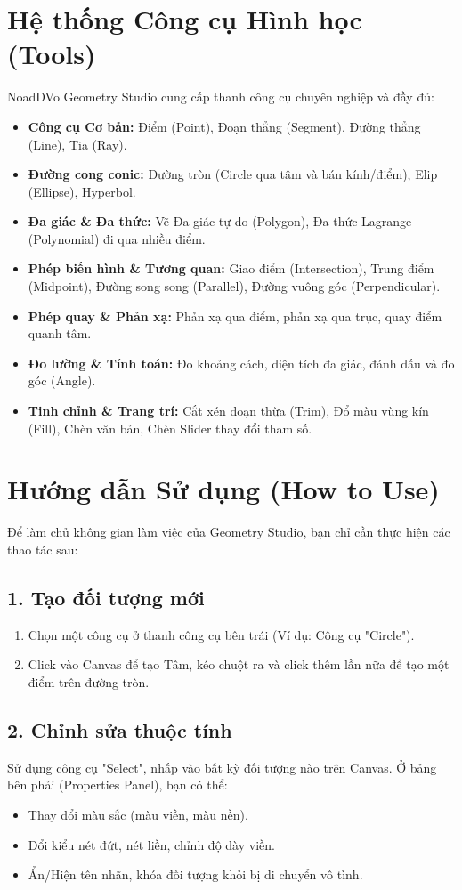 \documentclass[12pt,a4paper]{article}
\begin{document}
\section{Hệ thống Công cụ Hình học (Tools)}
NoadDVo Geometry Studio cung cấp thanh công cụ chuyên nghiệp và đầy đủ:
\begin{itemize}[label=$\circ$]
    \item \textbf{Công cụ Cơ bản:} Điểm (Point), Đoạn thẳng (Segment), Đường thẳng (Line), Tia (Ray).
    \item \textbf{Đường cong conic:} Đường tròn (Circle qua tâm và bán kính/điểm), Elip (Ellipse), Hyperbol.
    \item \textbf{Đa giác \& Đa thức:} Vẽ Đa giác tự do (Polygon), Đa thức Lagrange (Polynomial) đi qua nhiều điểm.
    \item \textbf{Phép biến hình \& Tương quan:} Giao điểm (Intersection), Trung điểm (Midpoint), Đường song song (Parallel), Đường vuông góc (Perpendicular).
    \item \textbf{Phép quay \& Phản xạ:} Phản xạ qua điểm, phản xạ qua trục, quay điểm quanh tâm.
    \item \textbf{Đo lường \& Tính toán:} Đo khoảng cách, diện tích đa giác, đánh dấu và đo góc (Angle).
    \item \textbf{Tinh chỉnh \& Trang trí:} Cắt xén đoạn thừa (Trim), Đổ màu vùng kín (Fill), Chèn văn bản, Chèn Slider thay đổi tham số.
\end{itemize}

\section{Hướng dẫn Sử dụng (How to Use)}
Để làm chủ không gian làm việc của Geometry Studio, bạn chỉ cần thực hiện các thao tác sau:

\subsection*{1. Tạo đối tượng mới}
\begin{enumerate}
    \item Chọn một công cụ ở thanh công cụ bên trái (Ví dụ: Công cụ "Circle").
    \item Click vào Canvas để tạo Tâm, kéo chuột ra và click thêm lần nữa để tạo một điểm trên đường tròn.
\end{enumerate}

\subsection*{2. Chỉnh sửa thuộc tính}
Sử dụng công cụ "Select", nhấp vào bất kỳ đối tượng nào trên Canvas. Ở bảng bên phải (Properties Panel), bạn có thể:
\begin{itemize}[label=-]
    \item Thay đổi màu sắc (màu viền, màu nền).
    \item Đổi kiểu nét đứt, nét liền, chỉnh độ dày viền.
    \item Ẩn/Hiện tên nhãn, khóa đối tượng khỏi bị di chuyển vô tình.
\end{itemize}
\end{document}
